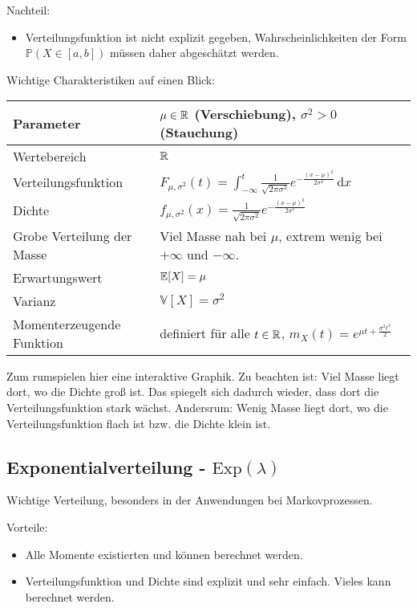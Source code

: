 \documentclass[11pt, a4paper]{book}
\newcommand{\dint}{\, \mathrm{d}}
\begin{document}
{Nachteil:}
\begin{itemize}
	\item Verteilungsfunktion ist nicht explizit gegeben, Wahrscheinlichkeiten der Form $\mathbb P(X\in [a,b])$ m\"ussen daher abgesch\"atzt werden.
\end{itemize}

Wichtige Charakteristiken auf einen Blick:
\begin{center}
\begin{tabular}[h]{|l|l|}
\hline
Parameter& $\mu\in \mathbb{R}$ (Verschiebung), $\sigma^2>0$ (Stauchung)\\
\hline
Wertebereich & $\mathbb{R}$\\
\hline
Verteilungsfunktion & $F_{\mu,\sigma^2}(t)=\int_{-\infty}^t \frac{1}{\sqrt{2\pi \sigma^2}} e^{-\frac{(x-\mu)^2}{2 \sigma^2}} \dint x$ \\
\hline
Dichte & $f_{\mu,\sigma^2}(x)=\frac{1}{\sqrt{2\pi \sigma^2}} e^{-\frac{(x-\mu)^2}{2\sigma^2}}$\\
\hline
Grobe Verteilung der Masse & Viel Masse nah bei $\mu$, extrem wenig bei $+\infty$ und $-\infty$.\\
\hline
Erwartungswert& $\mathbb{E}[X]=\mu$ \\
\hline
Varianz & $\mathbb V[X]=\sigma^2$\\
\hline
Momenterzeugende Funktion& definiert f\"ur alle $t\in\mathbb{R}$, $m_X(t)=e^{\mu t +\frac{\sigma^2 t^2}{2}}$\\
\hline
\end{tabular}

\end{center}
Zum rumspielen hier eine interaktive Graphik. Zu beachten ist: Viel Masse liegt dort, wo die Dichte gro\ss{} ist. Das spiegelt sich dadurch wieder, dass dort die Verteilungsfunktion stark w\"achst. Andersrum: Wenig Masse liegt dort, wo die Verteilungsfunktion flach ist bzw. die Dichte klein ist. 



\subsection{Exponentialverteilung - $\text{Exp}(\lambda)$}

Wichtige Verteilung, besonders in der Anwendungen bei Markovprozessen.\smallskip

{Vorteile:} 
\begin{itemize}
\item Alle Momente existierten und k\"onnen berechnet werden.
\item Verteilungsfunktion und Dichte sind explizit und sehr einfach. Vieles kann berechnet werden.
\end{itemize}
\end{document}
